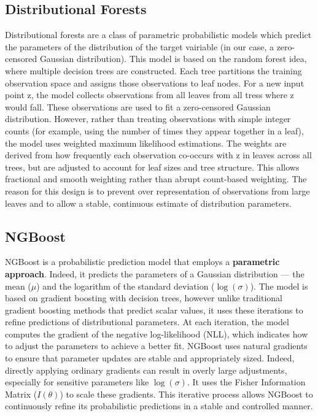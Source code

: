 \documentclass[12pt,a4paper]{book}
\begin{document}
\subsection{Distributional Forests} 
Distributional forests are a class of parametric probabilistic models which predict the parameters of the distribution of the target vairiable (in our case, a zero-censored Gaussian distribution). This model is based on the random forest idea, where multiple decision trees are constructed. Each tree partitions the training observation space and assigns those observations to leaf nodes. For a new input point z, the model collects observations from all leaves from all tress where z would fall. These observations are used to fit a zero-censored Gaussian distribution. However, rather than treating observations with simple integer counts (for example, using the number of times they appear together in a leaf), the model uses weighted maximum likelihood estimations. The weights are derived from how frequently each observation co-occurs with z in leaves across all trees, but are adjusted to account for leaf sizes and tree structure. This allows fractional and smooth weighting rather than abrupt count-based weighting. The reason for this design is to prevent over representation of observations from large leaves and to allow a stable, continuous estimate of distribution parameters.

\subsection{NGBoost} 
NGBoost is a probabilistic prediction model that employs a \textbf{parametric approach}. Indeed, it predicts the parameters of a Gaussian distribution — the mean ($\mu$) and the logarithm of the standard deviation ($\log(\sigma)$). The model is based on gradient boosting with decision trees, however unlike traditional gradient boosting methods that predict scalar values, it uses these iterations to refine predictions of distributional parameters. At each iteration, the model computes the gradient of the negative log-likelihood (NLL), which indicates how to adjust the parameters to achieve a better fit. NGBoost uses natural gradients to ensure that parameter updates are stable and appropriately sized. Indeed, directly applying ordinary gradients can result in overly large adjustments, especially for sensitive parameters like $\log(\sigma)$. It uses the Fisher Information Matrix ($I(\theta)$) to scale these gradients. This iterative process allows NGBoost to continuously refine its probabilistic predictions in a stable and controlled manner.
\end{document}
